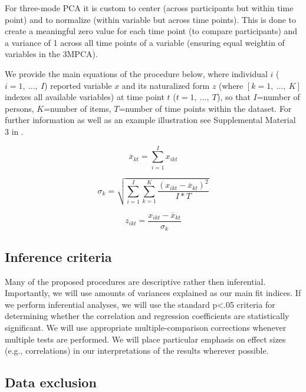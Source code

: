 \documentclass[]{article}
\begin{document}
For three-mode PCA it is custom to center (across participants but
within time point) and to normalize (within variable but across time
points). This is done to create a meaningful zero value for each time
point (to compare participants) and a variance of 1 across all time
points of a variable (ensuring equal weightin of variables in the
3MPCA).

We provide the main equations of the procedure below, where individual
\(i\) (\(i = 1,\ ...,\ I\)) reported variable \(x\) and its naturalized
form \(z\) (where \([k = 1,\ ...,\ K]\) indexes all available variables)
at time point \(t\) (\(t = 1,\ ...,\ T\)), so that \(I\)=number of
persons, \(K\)=number of items, \(T\)=number of time points within the
dataset. For further information as well as an example illustration see
Supplemental Material 3 in \citet{Monden2015}.

\begin{equation} \label{eq:Mean}
  \overline{x}_{kt} =  \sum_{i=1}^I x_{ikt}
\end{equation}

\begin{equation} \label{eq:NormalizationSd}
  \sigma_{k} =  \sqrt{\sum_{i=1}^I \sum_{k=1}^K \frac{(x_{ikt}-\overline{x}_{kt})^2}{I*T}}
\end{equation}

\begin{equation} \label{eq:NormalizedScore}
  z_{ikt} =  \frac{x_{ikt}-\overline{x}_{kt}}{\sigma_{k}}
\end{equation}

\hypertarget{inference-criteria}{%
\subsection{Inference criteria}\label{inference-criteria}}

Many of the proposed procedures are descriptive rather then inferential.
Importantly, we will use amounts of variances explained as our main fit
indices. If we perform inferential analyses, we will use the standard
p\textless.05 criteria for determining whether the correlation and
regression coefficients are statistically significant. We will use
appropriate multiple-comparison corrections whenever multiple tests are
performed. We will place particular emphasis on effect sizes (e.g.,
correlations) in our interpretations of the results wherever possible.

\hypertarget{data-exclusion}{%
\subsection{Data exclusion}\label{data-exclusion}}
\end{document}
